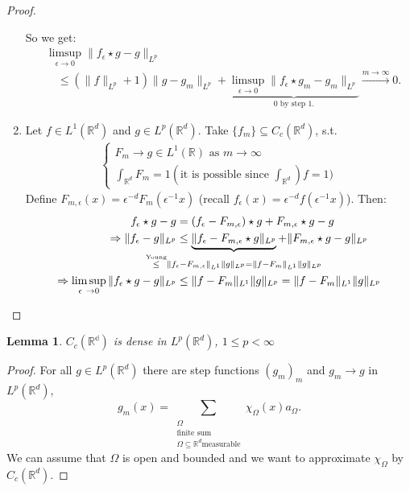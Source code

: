 \documentclass{report}
\theoremstyle{tommy}
\newtheorem{lem}[defn]{Lemma}
\begin{document}
\begin{proof}
\begin{enumerate}[label=Step \arabic*:]
      So we get:
      \begin{align*}
        &\limsup_{\epsilon \to 0} \|f_\epsilon \star g - g\|_{L^p} \\
        &\quad\le (\|f\|_{L^p} + 1) \|g - g_m\|_{L^p} + \underbrace{\limsup_{\epsilon \to 0} \|f_\epsilon \star g_m - g_m\|_{L^p}}_{0 \text{ by step 1.}} \xrightarrow{m \to \infty} 0.
      \end{align*}
      \item Let \(f \in L^1(\mathbb{R}^d)\) and \(g \in L^p(\mathbb{R}^d)\). Take \(\{f_m\} \subseteq C_c(\mathbb{R}^d)\), s.t. 
      \begin{align*}
        \begin{cases}
          F_m \to g \in L^1(\mathbb{R}) \text{ as } m \to \infty \\
          \int_{\mathbb{R}^d} F_m = 1 (\text{it is possible since } \int_{\mathbb{R}^d}) f = 1)
        \end{cases}
      \end{align*} 
      Define \(F_{m, \epsilon}(x) = \epsilon^{-d} F_m(\epsilon^{-1} x)\) (recall \(f_\epsilon(x) = \epsilon^{-d} f(\epsilon^{-1} x)\)). Then:
      \begin{align*}
        f_\epsilon \star g - g &= (f_\epsilon - F_{m, \epsilon}) \star g + F_{m, \epsilon} \star g -g \\
        \Rightarrow \|f_\epsilon - g \|_{L^p} &\le \underbrace{\|f_\epsilon - F_{m, \epsilon} \star g\|_{L^p}}_{\mathclap{\overset{\text{Young}}{\le} \|f_\epsilon - F_{m, \epsilon}\|_{L^1} \|g\|_{L^p} = \|f - F_m\|_{L^1} \|g\|_{L^p}}} + \|F_{m, \epsilon} \star g - g\|_{L^p} \\
        \Rightarrow \limsup_{\epsilon \to 0} \|f_\epsilon \star g - g\|_{L^p} &\le \|f - F_m\|_{L^1} \|g\|_{L^p} = \|f - F_m\|_{L^1} \|g \|_{L^p} \qedhere
      \end{align*}
    \end{enumerate}
  \end{proof}

  
  \begin{lem}
    \(C_c(\mathbb{{R}^d})\) is dense in \(L^p(\mathbb{R}^d)\), \(1 \le p < \infty\)
  \end{lem}

  \begin{proof}
    For all \(g \in L^p(\mathbb{R}^d)\) there are step functions \((g_m)_m\) and \(g_m \to g\) in \(L^p(\mathbb{R}^d)\),
    \[g_m(x) = \sum_{\substack{\Omega \\ \text{finite sum} \\ \Omega \subseteq \mathbb{R}^d \text{measurable}}} \chi_\Omega(x) a_\Omega.\]
    We can assume that \(\Omega\) is open and bounded and we want to approximate \(\chi_\Omega\) by \(C_c(\mathbb{R}^d)\). 
  \end{proof}
\end{document}
